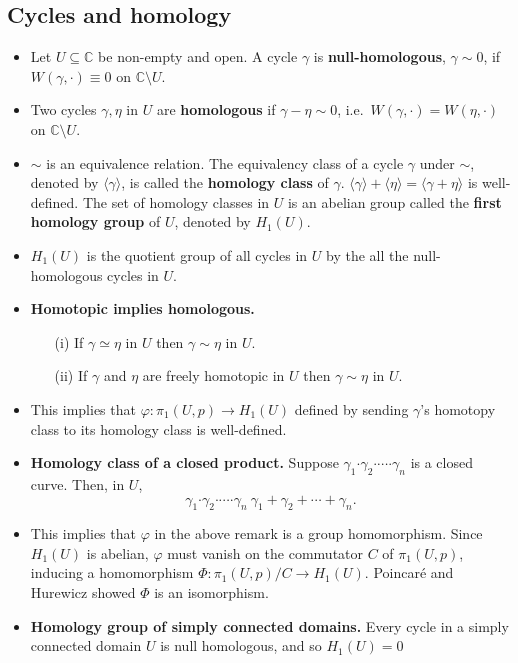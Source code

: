 \documentclass{article}
\newenvironment{topic}[1]{%
{\subsection{#1}}%
\begin{itemize}%
}{%
\end{itemize}%
}
\newcommand{\theorem}[1]{\item {\bf #1.}}
\newcommand{\corollary}[1]{\item {\bf #1.}}
\newcommand{\lemma}[1]{\item {\bf #1.}}
\newcommand{\term}[1]{{\bf #1}}
\newcommand{\remark}{\item}
\newcommand{\curveproduct}{\boldsymbol{\cdot}}
\begin{document}
\begin{topic}{Cycles and homology}
\remark Let $U \subseteq \mathbb{C}$ be non-empty and open. A cycle $\gamma$ is \term{null-homologous}, $\gamma \sim 0$, if $W(\gamma, \cdot) \equiv 0$ on $\mathbb{C} \setminus U$.

\remark Two cycles $\gamma, \eta$ in $U$ are \term{homologous} if $\gamma - \eta \sim 0$, i.e.\ $W(\gamma, \cdot) = W(\eta, \cdot)$ on $\mathbb{C} \setminus U$.

\remark $\sim$ is an equivalence relation. The equivalency class of a cycle $\gamma$ under $\sim$, denoted by $\langle \gamma \rangle$, is called the \term{homology class} of $\gamma$. $\langle \gamma \rangle + \langle \eta \rangle = \langle \gamma + \eta \rangle$ is well-defined. The set of homology classes in $U$ is an abelian group called the \term{first homology group} of $U$, denoted by $H_1(U)$.

\remark $H_1(U)$ is the quotient group of all cycles in $U$ by the all the null-homologous cycles in $U$.

\theorem{Homotopic implies homologous} \begin{enumerate}
\item[(i)] If $\gamma \simeq \eta$ in $U$ then $\gamma \sim \eta$ in $U$.
\item[(ii)] If $\gamma$ and $\eta$ are freely homotopic in $U$ then $\gamma \sim \eta$ in $U$.
\end{enumerate}

\remark This implies that $\varphi : \pi_1(U, p) \to H_1(U)$ defined by sending $\gamma$'s homotopy class to its homology class is well-defined.

\lemma{Homology class of a closed product} Suppose $\gamma_1 \curveproduct \gamma_2 \curveproduct \cdots \curveproduct \gamma_n$ is a closed curve. Then, in $U$, $$\gamma_1 \curveproduct \gamma_2 \curveproduct \cdots \curveproduct \gamma_n ~ \gamma_1 + \gamma_2 + \cdots + \gamma_n.$$

\remark This implies that $\varphi$ in the above remark is a group homomorphism. Since $H_1(U)$ is abelian, $\varphi$ must vanish on the commutator $C$ of $\pi_1(U, p)$, inducing a homomorphism $\Phi : \pi_1(U, p)/C \to H_1(U)$. Poincar\'{e} and Hurewicz showed $\Phi$ is an isomorphism.

\corollary{Homology group of simply connected domains} Every cycle in a simply connected domain $U$ is null homologous, and so $H_1(U) = 0$ 

\end{topic}
\end{document}
